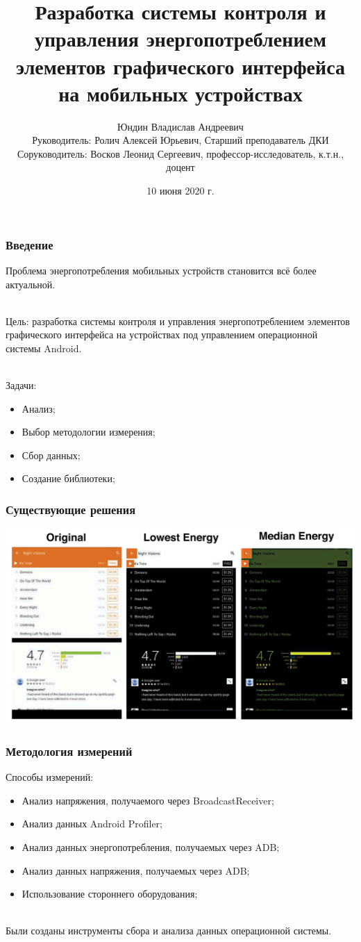 \documentclass{beamer}
\title[Заголовок]{\large Разработка системы контроля и управления энергопотреблением элементов графического интерфейса на мобильных устройствах \vspace{-2ex}}
\author[Юндин Владислав]{\footnotesize Юндин Владислав Андреевич\\ \vspace{2ex} Руководитель: Ролич Алексей Юрьевич, Старший преподаватель ДКИ\\ Соруководитель: Восков Леонид Сергеевич, профессор-исследователь, к.т.н., доцент}
\institute[Высшая школа экономики]{НИУ ВШЭ, Информатика и вычислительная техника}
\date{10 июня 2020 г.}
\begin{document}
    \frame[plain]{\titlepage}
    
    \begin{frame}
    	\frametitle{Введение}
        Проблема энергопотребления мобильных устройств становится всё более актуальной.\\~

        Цель: разработка системы контроля и управления энергопотреблением элементов графического интерфейса на устройствах под управлением операционной системы Android.\\~

        Задачи:
        \begin{itemize}
            \item Анализ;
            \item Выбор методологии измерения;
            \item Сбор данных;
            \item Создание библиотеки;
        \end{itemize}

    \end{frame}
    \begin{frame}
        \frametitle{Существующие решения}
        \includegraphics[width=\linewidth]{AMOLED}
    \end{frame}
    \begin{frame}
        \frametitle{Методология измерений}
        Способы измерений:
        \begin{itemize}
            \item Анализ напряжения, получаемого через BroadcastReceiver;
            \item Анализ данных Android Profiler;
            \item Анализ данных энергопотребления, получаемых через ADB;
            \item Анализ данных напряжения, получаемых через ADB;
            \item Использование стороннего оборудования;
        \end{itemize}~\\
        Были созданы инструменты сбора и анализа данных операционной системы.
    \end{frame}
\end{document}
